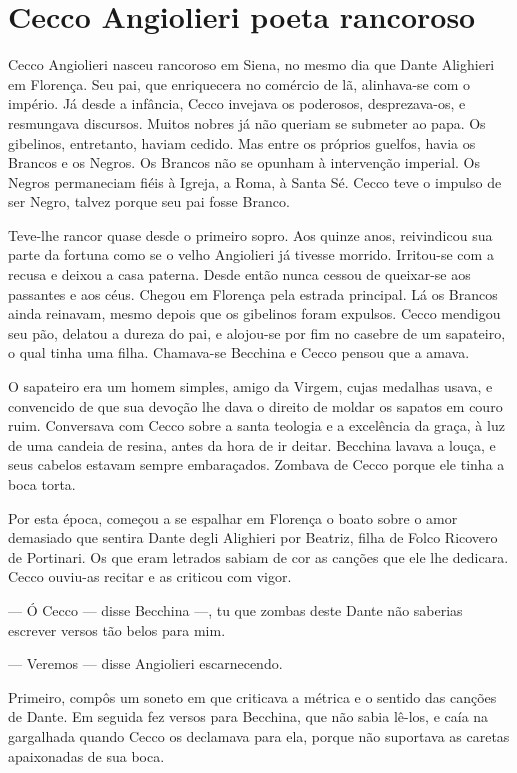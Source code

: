 \chapter{Cecco Angiolieri poeta rancoroso}

Cecco Angiolieri nasceu rancoroso em Siena, no mesmo dia que Dante
Alighieri em Florença. Seu pai, que enriquecera no comércio de lã,
alinhava-se com o império. Já desde a infância, Cecco invejava os
poderosos, desprezava-os, e resmungava discursos. Muitos nobres já não
queriam se submeter ao papa. Os gibelinos, entretanto, haviam cedido. Mas
entre os próprios guelfos, havia os Brancos e os Negros. Os Brancos não se
opunham à intervenção imperial. Os Negros permaneciam fiéis à Igreja, a
Roma, à Santa Sé. Cecco teve o impulso de ser Negro, talvez porque seu pai
fosse Branco.

Teve-lhe rancor quase desde o primeiro sopro. Aos quinze anos, reivindicou
sua parte da fortuna como se o velho Angiolieri já tivesse morrido.
Irritou-se com a recusa e deixou a casa paterna. Desde então nunca cessou
de queixar-se aos passantes e aos céus. Chegou em Florença pela estrada
principal. Lá os Brancos ainda reinavam, mesmo depois que os gibelinos
foram expulsos. Cecco mendigou seu pão, delatou a dureza do pai, e
alojou-se por fim no casebre de um sapateiro, o qual tinha uma filha.
Chamava-se Becchina e Cecco pensou que a amava.

O sapateiro era um homem simples, amigo da Virgem, cujas medalhas usava, e
convencido de que sua devoção lhe dava o direito de moldar os sapatos em
couro ruim. Conversava com Cecco sobre a santa teologia e a excelência da
graça, à luz de uma candeia de resina, antes da hora de ir deitar.
Becchina lavava a louça, e seus cabelos estavam sempre embaraçados.
Zombava de Cecco porque ele tinha a boca torta.

Por esta época, começou a se espalhar em Florença o boato sobre o amor
demasiado que sentira Dante degli Alighieri por Beatriz, filha de Folco
Ricovero de Portinari. Os que eram letrados sabiam de cor as canções que
ele lhe dedicara. Cecco ouviu-as recitar e as criticou com vigor.

--- Ó Cecco --- disse Becchina ---, tu que zombas deste Dante não saberias escrever
versos tão belos para mim.

--- Veremos --- disse Angiolieri escarnecendo.

Primeiro, compôs um soneto em que criticava a métrica e o sentido das
canções de Dante. Em seguida fez versos para Becchina, que não sabia
lê-los, e caía na gargalhada quando Cecco os declamava para ela, porque
não suportava as caretas apaixonadas de sua boca.

